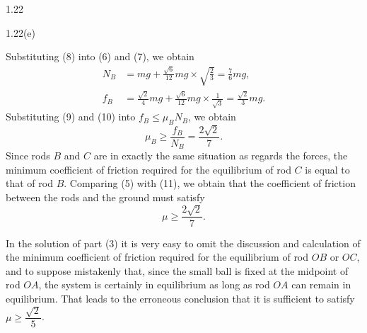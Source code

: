 \begin{solution}{1.22}
\begin{figbox}{1.22(e)}
\end{figbox}

Substituting (8) into (6) and (7), we obtain
\begin{align}
N_B&=mg+\frac{\sqrt{6}}{12}mg\times\sqrt{\frac{2}{3}}=\frac{7}{6}mg, \tag{9}\\
f_B&=\frac{\sqrt{2}}{4}mg+\frac{\sqrt{6}}{12}mg\times\frac{1}{\sqrt{3}}=\frac{\sqrt{2}}{3}mg. \tag{10}
\end{align}
Substituting (9) and (10) into $f_B\leq\mu_BN_B$, we obtain
\begin{equation}
\mu_B\geq\frac{f_B}{N_B}=\frac{2\sqrt{2}}{7}. \tag{11}
\end{equation}
Since rods $B$ and $C$ are in exactly the same situation as regards the forces, the minimum coefficient of friction required for the equilibrium of rod $C$ is equal to that of rod $B$. Comparing (5) with (11), we obtain that the coefficient of friction between the rods and the ground must satisfy
\[
\mu\geq\frac{2\sqrt{2}}{7}.
\]

\begin{commentary}
In the solution of part (3) it is very easy to omit the discussion and calculation of the minimum coefficient of friction required for the equilibrium of rod $OB$ or $OC$, and to suppose mistakenly that, since the small ball is fixed at the midpoint of rod $OA$, the system is certainly in equilibrium as long as rod $OA$ can remain in equilibrium. That leads to the erroneous conclusion that it is sufficient to satisfy $\mu\geq\dfrac{\sqrt{2}}{5}$.
\end{commentary}

\end{solution}

